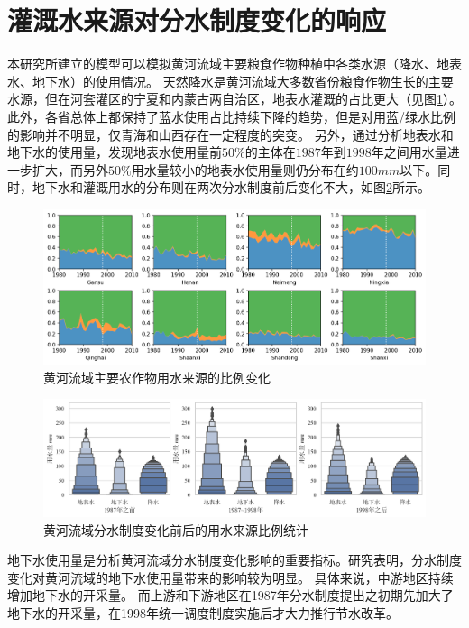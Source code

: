 \section{灌溉水来源对分水制度变化的响应}

本研究所建立的模型可以模拟黄河流域主要粮食作物种植中各类水源（降水、地表水、地下水）的使用情况。
天然降水是黄河流域大多数省份粮食作物生长的主要水源，但在河套灌区的宁夏和内蒙古两自治区，地表水灌溉的占比更大（见图\ref{ch6:fig:sources}）。
此外，各省总体上都保持了蓝水使用占比持续下降的趋势，但是对用蓝/绿水比例的影响并不明显，仅青海和山西存在一定程度的突变。
另外，通过分析地表水和地下水的使用量，发现地表水使用量前$50\%$的主体在$1987$年到$1998$年之间用水量进一步扩大，而另外$50\%$用水量较小的地表水使用量则仍分布在约$100mm$以下。同时，地下水和灌溉用水的分布则在两次分水制度前后变化不大，如图\ref{ch6:fig:sources_change}所示。


\begin{figure}[htb]
    \centering
    \includegraphics[width=\textwidth]{img/ch6/ch6_green_blue_water.png}
    \caption{黄河流域主要农作物用水来源的比例变化}\label{ch6:fig:sources}
\end{figure}

\begin{figure}[htb]
    \centering
    \includegraphics[width=\textwidth]{img/ch6/ch6_sources_change.png}
    \caption{黄河流域分水制度变化前后的用水来源比例统计}\label{ch6:fig:sources_change}
\end{figure}

地下水使用量是分析黄河流域分水制度变化影响的重要指标。研究表明，分水制度变化对黄河流域的地下水使用量带来的影响较为明显。
具体来说，中游地区持续增加地下水的开采量。
而上游和下游地区在1987年分水制度提出之初期先加大了地下水的开采量，在1998年统一调度制度实施后才大力推行节水改革。

